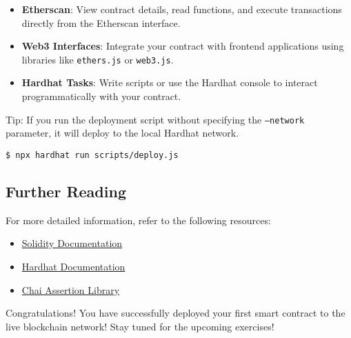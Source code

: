 \documentclass[12pt]{article}
\begin{document}
\begin{itemize}
    \item \textbf{Etherscan}: View contract details, read functions, and execute transactions directly from the Etherscan interface.
    
    \item \textbf{Web3 Interfaces}: Integrate your contract with frontend applications using libraries like \texttt{ethers.js} or \texttt{web3.js}.
    
    \item \textbf{Hardhat Tasks}: Write scripts or use the Hardhat console to interact programmatically with your contract.
\end{itemize}
Tip: If you run the deployment script without specifying the \texttt{--network} parameter, it will deploy to the local Hardhat network.
\begin{verbatim}
$ npx hardhat run scripts/deploy.js
\end{verbatim}

\subsection{Further Reading}

For more detailed information, refer to the following resources:

\begin{itemize}
    \item \href{https://docs.soliditylang.org/en/v0.8.0/}{Solidity Documentation}
    \item \href{https://hardhat.org/docs}{Hardhat Documentation}
    \item \href{https://www.chaijs.com/}{Chai Assertion Library}

\end{itemize}
Congratulations! You have successfully deployed your first smart contract to the live blockchain network! Stay tuned for the upcoming exercises!
\end{document}

